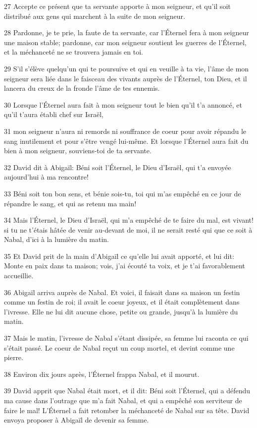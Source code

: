 \par 27 Accepte ce présent que ta servante apporte à mon seigneur, et qu'il soit distribué aux gens qui marchent à la suite de mon seigneur.
\par 28 Pardonne, je te prie, la faute de ta servante, car l'Éternel fera à mon seigneur une maison stable; pardonne, car mon seigneur soutient les guerres de l'Éternel, et la méchanceté ne se trouvera jamais en toi.
\par 29 S'il s'élève quelqu'un qui te poursuive et qui en veuille à ta vie, l'âme de mon seigneur sera liée dans le faisceau des vivants auprès de l'Éternel, ton Dieu, et il lancera du creux de la fronde l'âme de tes ennemis.
\par 30 Lorsque l'Éternel aura fait à mon seigneur tout le bien qu'il t'a annoncé, et qu'il t'aura établi chef sur Israël,
\par 31 mon seigneur n'aura ni remords ni souffrance de coeur pour avoir répandu le sang inutilement et pour s'être vengé lui-même. Et lorsque l'Éternel aura fait du bien à mon seigneur, souviens-toi de ta servante.
\par 32 David dit à Abigaïl: Béni soit l'Éternel, le Dieu d'Israël, qui t'a envoyée aujourd'hui à ma rencontre!
\par 33 Béni soit ton bon sens, et bénie sois-tu, toi qui m'as empêché en ce jour de répandre le sang, et qui as retenu ma main!
\par 34 Mais l'Éternel, le Dieu d'Israël, qui m'a empêché de te faire du mal, est vivant! si tu ne t'étais hâtée de venir au-devant de moi, il ne serait resté qui que ce soit à Nabal, d'ici à la lumière du matin.
\par 35 Et David prit de la main d'Abigaïl ce qu'elle lui avait apporté, et lui dit: Monte en paix dans ta maison; vois, j'ai écouté ta voix, et je t'ai favorablement accueillie.
\par 36 Abigaïl arriva auprès de Nabal. Et voici, il faisait dans sa maison un festin comme un festin de roi; il avait le coeur joyeux, et il était complètement dans l'ivresse. Elle ne lui dit aucune chose, petite ou grande, jusqu'à la lumière du matin.
\par 37 Mais le matin, l'ivresse de Nabal s'étant dissipée, sa femme lui raconta ce qui s'était passé. Le coeur de Nabal reçut un coup mortel, et devint comme une pierre.
\par 38 Environ dix jours après, l'Éternel frappa Nabal, et il mourut.
\par 39 David apprit que Nabal était mort, et il dit: Béni soit l'Éternel, qui a défendu ma cause dans l'outrage que m'a fait Nabal, et qui a empêché son serviteur de faire le mal! L'Éternel a fait retomber la méchanceté de Nabal sur sa tête. David envoya proposer à Abigaïl de devenir sa femme.
